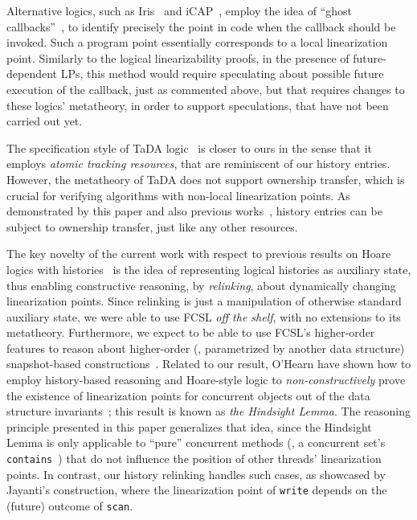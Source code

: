 Alternative logics, such as
Iris~\cite{JungSSSTBD+POPL15,JungKBD+ICFP16} and
iCAP~\cite{SvendsenB+ESOP14}, employ the idea of ``ghost
callbacks''~\cite{Jacobs-Piessens+POPL11}, to identify precisely the
point in code when the callback should be invoked.  Such a program
point essentially corresponds to a local linearization
point. Similarly to the logical linearizability proofs, in the
presence of future-dependent LPs, this method would require
speculating about possible future execution of the callback, just as
commented above, but that requires changes to these logics'
metatheory, in order to support speculations, that have not been
carried out yet.

The specification style of TaDA logic~\cite{PintoDYG+ECOOP14} is
closer to ours in the sense that it employs \emph{atomic tracking
  resources}, that are reminiscent of our history entries. However,
the metatheory of TaDA does not support ownership transfer, which is
crucial for verifying algorithms with non-local linearization
points. As demonstrated by this paper and also previous
works~\cite{SergeyNB+ESOP15,SergeyNBD+OOPSLA16}, history entries can
be subject to ownership transfer, just like any other
resources.


The key novelty of the current work with respect to previous results
on Hoare logics with histories~\cite{FuLFSZ+CONCUR10, LiangF+PLDI13,
  GotsmanRY+ESOP13, BellAW+SAS10, SergeyNB+ESOP15, HemedRV+DISC15} is
the idea of representing logical histories as auxiliary state, thus
enabling constructive reasoning, by \emph{relinking}, about
dynamically changing linearization points.
%
Since relinking is just a manipulation of otherwise standard auxiliary
state, we were able to use FCSL \emph{off the shelf}, with no
extensions to its metatheory. Furthermore, we expect to be able to use
FCSL's higher-order features to reason about higher-order (\ie,
parametrized by another data structure) snapshot-based
constructions~\cite{PetrankT+DISC13}.
%
Related to our result, O'Hearn \etal have shown how to employ
history-based reasoning and Hoare-style logic to
\emph{non-constructively} prove the existence of linearization points
for concurrent objects out of the data structure
invariants~\cite{OHearnRVYY+PODC10}; this result is known as \emph{the
  Hindsight Lemma}. The reasoning principle presented in this paper
generalizes that idea, since the Hindsight Lemma is only applicable to
``pure'' concurrent methods (\eg, a concurrent set's
\texttt{contains}~\cite{HellerHLMSS+OPODIS05}) that do not influence
the position of other threads' linearization points. In contrast, our
history relinking handles such cases, as showcased by Jayanti's
construction, where the linearization point of \texttt{write} depends
on the (future) outcome of \texttt{scan}.

